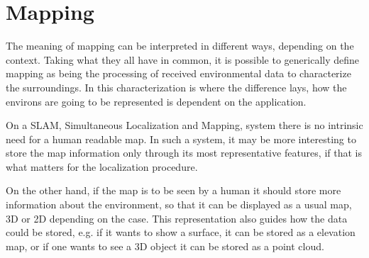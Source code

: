 
\section{Mapping}

The meaning of mapping can be interpreted in different ways, depending on the
context. Taking what they all have in common, it is possible to generically
define mapping as being the processing of received environmental data to
characterize the surroundings. In this characterization is where the difference
lays, how the environs are going to be represented is dependent on the
application.

On a SLAM, Simultaneous Localization and Mapping, system there is no intrinsic
need for a human readable map. In such a system, it may be more interesting to
store the map information only through its most representative features, if that
is what matters for the localization procedure.

On the other hand, if the map is to be seen by a human it should store more
information about the environment, so that it can be displayed as a usual map,
3D or 2D depending on the case. This representation also guides how the data
could be stored, e.g. if it wants to show a surface, it can be stored as a
elevation map, or if one wants to see a 3D object it can be stored as a point
cloud.

